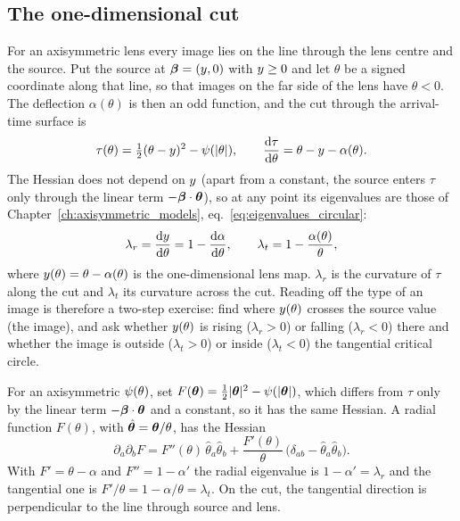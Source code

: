 \subsection{The one-dimensional cut}
\label{sec:oi_cut}

For an axisymmetric lens every image lies on the line through the lens
centre and the source.  Put the source at $\boldsymbol{\beta}=(y,0)$ with
$y\ge 0$ and let $\theta$ be a signed coordinate along that
line, so that images on the far side of the lens have $\theta<0$.  The
deflection $\alpha(\theta)$ is then an odd function, and the cut through
the arrival-time surface is
\begin{equation}
    \tau(\theta) = \tfrac{1}{2}(\theta-y)^2 - \psi(|\theta|), \qquad
    \frac{\mathrm{d} \tau}{\mathrm{d} \theta} = \theta - y - \alpha(\theta).
    \label{eq:oi_tau_cut}
\end{equation}
The Hessian does not depend on $y$ (apart from a constant, the source
enters $\tau$ only through the linear term $-\boldsymbol{\beta}\cdot\boldsymbol{\theta}$), so
at any point its eigenvalues are those of
Chapter~\ref{ch:axisymmetric_models}, eq.~\eqref{eq:eigenvalues_circular}:
\begin{equation}
    \lambda_r = \frac{\mathrm{d} y}{\mathrm{d} \theta} = 1-\frac{\mathrm{d} \alpha}{\mathrm{d} \theta}, \qquad
    \lambda_t = 1-\frac{\alpha(\theta)}{\theta},
    \label{eq:oi_lambdas}
\end{equation}
where $y(\theta)=\theta-\alpha(\theta)$ is the one-dimensional lens
map.  $\lambda_r$ is the curvature of $\tau$ along the cut and
$\lambda_t$ its curvature across the cut.  Reading off the type
of an image is therefore a two-step exercise: find where
$y(\theta)$ crosses the source value (the image), and ask whether
$y(\theta)$ is rising ($\lambda_r>0$) or falling ($\lambda_r<0$)
there and whether the image is outside ($\lambda_t>0$) or inside
($\lambda_t<0$) the tangential critical circle.

\begin{derivation}
For an axisymmetric $\psi(\theta)$, set
$F(\boldsymbol{\theta})=\tfrac{1}{2}|\boldsymbol{\theta}|^2-\psi(|\boldsymbol{\theta}|)$, which differs from
$\tau$ only by the linear term $-\boldsymbol{\beta}\cdot\boldsymbol{\theta}$ and a constant,
so it has the same Hessian.  A radial function $F(\theta)$, with
$\hat{\boldsymbol{\theta}}=\boldsymbol{\theta}/\theta$, has the Hessian
\[
  \partial_a\partial_b F
  = F''(\theta)\,\hat\theta_a\hat\theta_b
  + \frac{F'(\theta)}{\theta}\,\big(\delta_{ab}-\hat\theta_a\hat\theta_b\big).
\]
With $F'=\theta-\alpha$ and $F''=1-\alpha'$ the radial eigenvalue is
$1-\alpha'=\lambda_r$ and the tangential one is
$F'/\theta = 1-\alpha/\theta=\lambda_t$.  On the cut, the tangential
direction is perpendicular to the line through source and lens.
\end{derivation}


